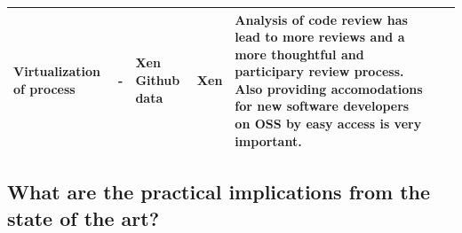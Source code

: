 \documentclass[]{book}
\begin{document}
\begin{longtable}[]{@{}lllllll@{}}
\begin{minipage}[t]{0.17\columnwidth}
Virtualization of process\strut
\end{minipage} & \begin{minipage}[t]{0.07\columnwidth}\raggedright\strut
-\strut
\end{minipage} & \begin{minipage}[t]{0.10\columnwidth}\raggedright\strut
Xen Github data\strut
\end{minipage} & \begin{minipage}[t]{0.12\columnwidth}\raggedright\strut
Xen\strut
\end{minipage} & \begin{minipage}[t]{0.10\columnwidth}\raggedright\strut
Analysis of code review has lead to more reviews and a more thoughtful
and participary review process. Also providing accomodations for new
software developers on OSS by easy access is very important.\strut
\end{minipage}\tabularnewline
\bottomrule
\end{longtable}

\subsection{What are the practical implications from the state of the
art?}\label{what-are-the-practical-implications-from-the-state-of-the-art}
\end{document}
